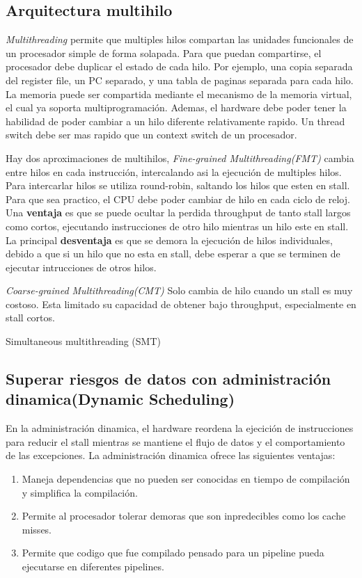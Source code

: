 \documentclass{article}
\begin{document}
\newpage
\subsection{Arquitectura multihilo}

\textit{Multithreading} permite que multiples hilos compartan las unidades funcionales de un procesador simple de forma solapada. Para que puedan compartirse, el procesador debe duplicar el estado de cada hilo.
Por ejemplo, una copia separada del register file, un PC separado, y una tabla de paginas separada para cada hilo.
La memoria puede ser compartida mediante el mecanismo de la memoria virtual, el cual ya soporta multiprogramación.
Ademas, el hardware debe poder tener la habilidad de poder cambiar a un hilo diferente relativamente rapido. Un thread switch debe ser mas rapido que un context switch de un procesador.

Hay dos aproximaciones de multihilos, \textit{Fine-grained Multithreading(FMT)} cambia entre hilos en cada instrucción, intercalando asi la ejecución de multiples hilos. Para intercarlar hilos se utiliza round-robin, saltando los hilos que esten en stall. Para que sea practico, el CPU debe poder cambiar de hilo en cada ciclo de reloj.
Una \textbf{ventaja} es que se puede ocultar la perdida throughput de tanto stall largos como cortos, ejecutando instrucciones de otro hilo mientras un hilo este en stall. 
La principal \textbf{desventaja} es que se demora la ejecución de hilos individuales, debido a que si un hilo que no esta en stall, debe esperar a que se terminen de ejecutar intrucciones de otros hilos.

\textit{Coarse-grained Multithreading(CMT)} Solo cambia de hilo cuando un stall es muy costoso. Esta limitado su capacidad de obtener bajo throughput, especialmente en stall cortos.

Simultaneous multithreading (SMT)

\newpage
\subsection{Superar riesgos de datos con administración dinamica(Dynamic Scheduling)}
En la administración dinamica, el hardware reordena la ejecición de instrucciones para reducir el stall  mientras se mantiene el flujo de datos y el comportamiento de las excepciones.
La administración dinamica ofrece las siguientes ventajas:
\begin{enumerate}
    \item Maneja dependencias que no pueden ser conocidas en tiempo de compilación y simplifica la compilación.
    \item Permite al procesador tolerar demoras que son inpredecibles como los cache misses.
    \item Permite que codigo que fue compilado pensado para un pipeline pueda ejecutarse en diferentes pipelines.
\end{enumerate}
\end{document}
